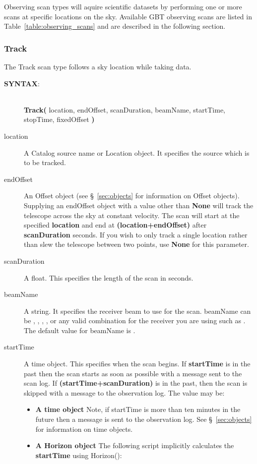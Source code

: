 Observing scan types will aquire scientific datasets by performing one or more scans
at specific locations on the sky. Available \gls{GBT} observing scans are listed in
Table~\ref{table:observing_scans} and are described in the following section.



\subsubsection{Track}\label{section:track}

The Track scan type follows a sky location while taking data. 

\begin{description}
\item[{\bf SYNTAX}:]\ \\
{\bfseries{\textcolor{pythonKeywords}{Track}}(}
location, endOffset, scanDuration, beamName, startTime, stopTime, fixedOffset
{\bf)}

\item[location] A Catalog source name or Location object. It specifies the 
source which is to be tracked.
\item[endOffset] An Offset object (see \S~\ref{sec:objects} for information on
Offset objects).\\
Supplying an endOffset object with a value other than {\bf None} will track the
telescope across the sky at constant velocity.  The scan will start at
the specified {\bf location} and end at {\bf (location+endOffset)} after
{\bf scanDuration} seconds. If you wish to only track a single location rather
than slew the telescope between two points, use {\bf None} for this parameter.
\item[scanDuration] A float.  This specifies the length of the scan in seconds.
\item[beamName] A string. It specifies the receiver beam to use for the scan. 
beamName can be , , , ,  or any valid combination for the 
receiver you are using such as . The default value for beamName is .
\item[startTime] A time object.  This specifies when the scan begins. If 
{\bf startTime} is in the past then the scan starts as soon as possible with a 
message sent to the scan log. If {\bf (startTime+scanDuration)} is in 
the past, then the scan is skipped with a message to the observation log. 
The value may be:
\begin{itemize}
\item {\bf A time object}  Note, if startTime is more than ten minutes in 
the future then a message is sent to the observation log.
See \S~\ref{sec:objects} for information on time objects.
\item {\bf A Horizon object} The following script implicitly calculates the
{\bf startTime} using Horizon():


\end{itemize}
\end{description}
